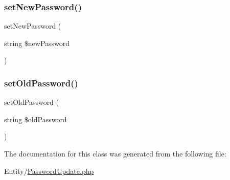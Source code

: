 \mbox{\label{class_app_1_1_entity_1_1_password_update_aace9cea053ed88d25bad2419046e75d6}} 
\subsubsection{\texorpdfstring{setNewPassword()}{setNewPassword()}}
{\footnotesize\ttfamily set\+New\+Password (\begin{DoxyParamCaption}\item[{string}]{\$new\+Password }\end{DoxyParamCaption})}

\mbox{\label{class_app_1_1_entity_1_1_password_update_aab87f5666a68bcdc134a882c3d15fd25}} 
\subsubsection{\texorpdfstring{setOldPassword()}{setOldPassword()}}
{\footnotesize\ttfamily set\+Old\+Password (\begin{DoxyParamCaption}\item[{string}]{\$old\+Password }\end{DoxyParamCaption})}



The documentation for this class was generated from the following file\+:\begin{DoxyCompactItemize}
\item 
Entity/\mbox{\hyperlink{_password_update_8php}{Password\+Update.\+php}}\end{DoxyCompactItemize}
